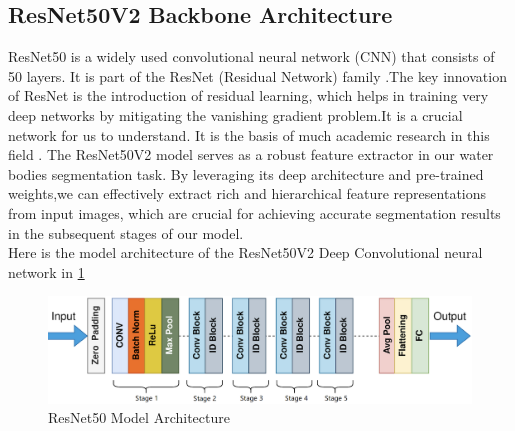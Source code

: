 \subsection{ResNet50V2 Backbone Architecture}
ResNet50 is a widely used convolutional neural network (CNN) that consists of 50 layers. It is part of the ResNet (Residual Network) family \cite{resnet}.The key innovation of ResNet is the introduction of residual learning, which helps in training very deep networks by mitigating the vanishing gradient problem.It is a crucial network for us to understand. It is the basis of much academic research in this field \cite{resnet1}.
The ResNet50V2 model serves as a robust feature extractor in our water bodies segmentation task. By leveraging its deep architecture and pre-trained weights,we can effectively extract rich and hierarchical feature representations from input images, which are crucial for achieving accurate segmentation results in the subsequent stages of our model.
\\
Here is the model architecture of the ResNet50V2 Deep Convolutional neural network in \ref{resnt} \\



\begin{figure}[H]
\centering
\includegraphics[width=1.05\textwidth]{figs/resnt.png}
\caption{ResNet50 Model Architecture}
\label{resnt}
\end{figure}

